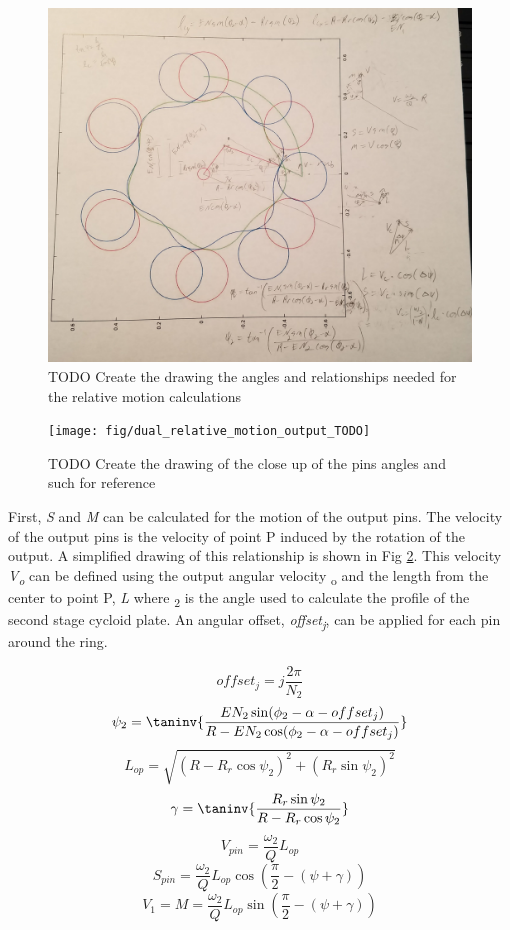 \begin{figure}[h]
	\centering
	\includegraphics[width=0.50\linewidth]{fig/dual_relative_motion_TODO}
   \caption{TODO Create the drawing the angles and relationships needed for the relative motion calculations}
   \label{fig:dual_relative_motion}
\end{figure}

\begin{figure}[h]
	\centering
	\texttt{[image: fig/dual\_relative\_motion\_output\_TODO]}
   \caption{TODO Create the drawing of the close up of the pins angles and such for reference}
   \label{fig:dual_relative_motion_output}
\end{figure}

First, \textit{S} and \textit{M} can be calculated for the motion of the output pins. The velocity of the output pins is the velocity of point P induced by the rotation of the output. A simplified drawing of this relationship is shown in Fig \ref{fig:dual_relative_motion_output}. This velocity \textit{V\textsubscript{o}} can be defined using the output angular velocity \textomega\textsubscript{o} and the length from the center to point P, \textit{L} where \textpsi\textsubscript{2} is the angle used to calculate the profile of the second stage cycloid plate. An angular offset, \textit{offset\textsubscript{j}}, can be applied for each pin around the ring. 

\begin{equation}\label{eq:offset2}
offset_j = j \frac{2\pi}{N_2}
\end{equation}
\begin{equation}\label{eq:psi2}
\psi_2 = \taninv{\frac{E N_2 \sin(\phi_2-\alpha-offset_j)}{R-E N_2\cos(\phi_2-\alpha-offset_j)}}
\end{equation}
\begin{equation} \label{eq:l_op}
L_{op} = \sqrt{(R-R_r\cos\psi_2)^2 + (R_r\sin\psi_2)^2}
\end{equation}
\begin{equation}
\gamma = \taninv{\frac{R_r\sin\psi_2}{R-R_r\cos\psi_2}}
\end{equation}
\begin{equation}
V_{pin} = \frac{\omega_2}{Q} L_{op}
\end{equation}
\begin{equation} \label{eq:s_pin}
S_{pin} = \frac{\omega_2}{Q} L_{op} \cos(\frac{\pi}{2}-(\psi+\gamma))
\end{equation}
\begin{equation}
V_{1} = M = \frac{\omega_2}{Q} L_{op} \sin(\frac{\pi}{2}-(\psi+\gamma))
\end{equation}


